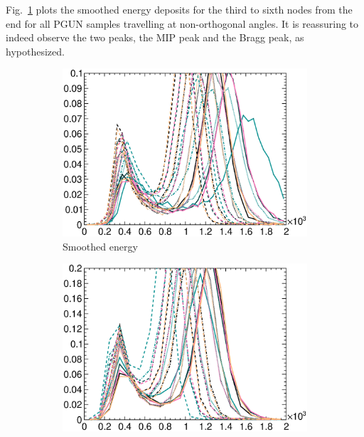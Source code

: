 	Fig.~\ref{subfig:esc-smooth-e} plots the smoothed energy deposits for the third to sixth nodes from the end for all PGUN samples travelling at non-orthogonal angles.
	It is reassuring to indeed observe the two peaks, the MIP peak and the Bragg peak, as hypothesized. 
     \begin{figure}[h]
        \centering
        \begin{subfigure}{\dbfigwid\textwidth}
             \centering
             \includegraphics[width=\textwidth]{figures/sel/dedx5_pdf_skew_smooth.eps}
             \caption{Smoothed energy}
             \label{subfig:esc-smooth-e}
        \end{subfigure}
        \begin{subfigure}{\dbfigwid\textwidth}
             \centering
             \includegraphics[width=\textwidth]{figures/sel/an_dedx5_pdf_skew_smooth_angnorm.eps}

\end{subfigure}
\end{figure}
